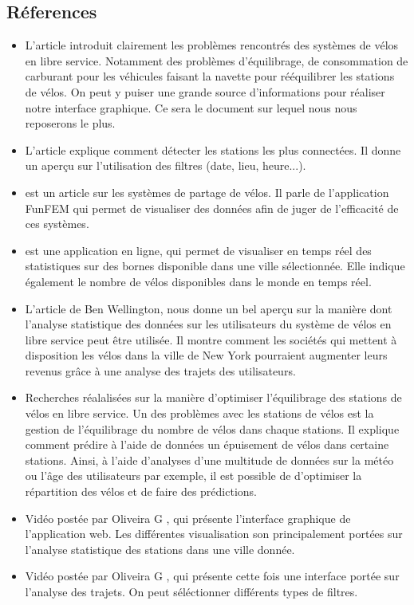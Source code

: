 \documentclass[12pt]{article}
\begin{document}
		\subsection{Réferences}
			\begin{itemize}
				\item L'article \cite{Oli16} introduit clairement les problèmes rencontrés des systèmes de vélos en libre service. Notamment des problèmes d'équilibrage, de consommation de carburant pour les véhicules faisant la navette pour rééquilibrer les stations de vélos. On peut y puiser une grande source d'informations pour réaliser notre interface graphique. Ce sera le document sur lequel nous nous reposerons le plus.

				\item L'article \cite{Ali14} explique comment détecter les stations les plus connectées. Il donne un aperçu sur  l'utilisation des filtres (date, lieu, heure...).

				\item \cite{BC16} est un article sur les systèmes de partage de vélos. Il parle de l'application FunFEM qui permet de visualiser des données afin de juger de l'efficacité de ces systèmes.

				\item \cite{BSM17} est une application en ligne, qui permet de visualiser en temps réel des statistiques sur des bornes disponible dans une ville sélectionnée.  Elle indique également le nombre de vélos disponibles dans le monde en temps réel.

				\item L'article \cite{BW} de Ben Wellington, nous donne un bel aperçu sur la manière dont l'analyse statistique des données sur les utilisateurs du système de vélos en libre service peut être utilisée. Il montre comment les sociétés qui mettent à disposition les vélos dans la ville de New York pourraient augmenter leurs revenus grâce à une analyse des trajets des utilisateurs.

				\item \cite{JL} Recherches réalalisées sur la manière d'optimiser l'équilibrage des stations de vélos en libre service. Un des problèmes avec les stations de vélos est la gestion de l'équilibrage du nombre de  vélos dans chaque stations. Il explique comment prédire à l'aide de données un épuisement de vélos dans certaine stations. Ainsi, à l'aide d'analyses d'une multitude de données sur la météo ou l'âge des utilisateurs par exemple, il est possible de d'optimiser la répartition des vélos et de faire des prédictions.

				\item Vidéo postée par Oliveira G \cite{state_station}, qui présente l'interface graphique de l'application web. Les différentes visualisation son principalement portées sur l'analyse statistique des stations dans une ville donnée.

				\item Vidéo postée par Oliveira G \cite{trips}, qui présente cette fois une interface portée sur l'analyse des trajets. On peut séléctionner différents types de filtres.

			\end{itemize}
	\newpage
			
\end{document}
